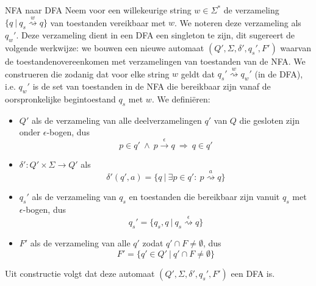 \begin{alg}{NFA naar DFA}
    \vspace{-0.2cm}
    Neem voor een willekeurige string $w \in \Sigma^*$ de verzameling $\{ q \ | \ q_s \overset{w}{\rightsquigarrow} q\}$ van toestanden vereikbaar met $w$. We noteren deze verzameling als $q_w'$. Deze verzameling dient in een DFA een singleton te zijn, dit sugereert de volgende werkwijze: we bouwen een nieuwe automaat $(Q', \Sigma,\delta',q_s',F')$ waarvan de toestandenovereenkomen met verzamelingen van toestanden van de NFA\@. We construeren die zodanig dat voor elke string $w$ geldt dat $q_s' \overset{w}{\rightsquigarrow} q_w'$ (in de DFA), i\@.e\@. $q_w'$ is de set van toestanden in de NFA die bereikbaar zijn vanaf de oorspronkelijke begintoestand $q_s$ met $w$.  We definiëren:
    \begin{itemize}
        \item 
            $Q'$ als de verzameling van alle deelverzamelingen $q'$ van $Q$ die gesloten zijn onder $\epsilon$-bogen, dus
            \begin{equation*}
                p \in q' \ \land \ p \overset{\epsilon}{\to} q \ \Rightarrow \ q \in q'
            \end{equation*}
        \item 
            $\delta': Q' \times \Sigma \rightarrow Q'$ als 
                \begin{equation*}
                    \delta'(q',a) = \{q \ | \ \exists p \in q': \ p \overset{a}{\rightsquigarrow} q \}
                \end{equation*}
        \item 
            $q_s'$ als de verzameling van $q_s$ en toestanden die bereikbaar zijn vanuit $q_s$ met $\epsilon$-bogen, dus
            \begin{equation*}
                q_s' = \{q_s,q \ | \ q_s \overset{\epsilon}{\rightsquigarrow} q \}
            \end{equation*}
        \item 
            $F'$ als de verzameling van alle $q'$ zodat $q' \cap F \neq \emptyset$, dus
            \begin{equation*}
                F' = \{q' \in Q' \ | \ q' \cap F \neq \emptyset \}
            \end{equation*}
    \end{itemize}
    Uit constructie volgt dat deze automaat $(Q', \Sigma,\delta',q_s',F')$ een DFA is.
\end{alg}

